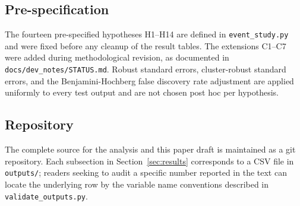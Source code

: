 \subsection*{Pre-specification}

The fourteen pre-specified hypotheses H1--H14 are defined in
\texttt{event\_study.py} and were fixed before any cleanup of the
result tables. The extensions C1--C7 were added during
methodological revision, as documented in
\texttt{docs/dev\_notes/STATUS.md}. Robust
standard errors, cluster-robust standard errors, and the
Benjamini-Hochberg false discovery rate adjustment
\citep{benjamini1995controlling} are applied uniformly to every
test output and are not chosen post hoc per hypothesis.

\subsection*{Repository}

The complete source for the analysis and this paper draft is
maintained as a git repository. Each subsection in
Section~\ref{sec:results} corresponds to a CSV file in
\texttt{outputs/}; readers seeking to audit a specific number
reported in the text can locate the underlying row by the variable
name conventions described in \texttt{validate\_outputs.py}.
